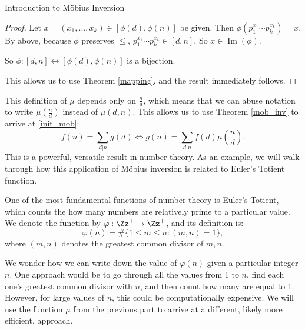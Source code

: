 \documentclass[12pt]{pom_thesis}
\DeclareMathOperator{\im}{Im}
\begin{document}
\begin{chapter}{Introduction to M\"obius Inversion}
\begin{proof}
Let $x = (x_1,...,x_k) \in [\phi(d), \phi(n)]$ be given. Then $\phi(p_1^{x_1}\cdots p_k^{x_k}) = x$. By above, because $\phi$ preserves $\leq$, $p_1^{x_1}\cdots p_k^{x_k} \in [d,n]$. So $x \in \im(\phi)$. 

So $\phi:[d,n] \leftrightarrow [\phi(d), \phi(n)]$ is a bijection.

This allows us to use Theorem \ref{mapping}, and the result immediately follows.
\end{proof}

This definition of $\mu$ depends only on $\frac nd$, which means that we can abuse notation to write $\mu(\frac nd)$ instead of $\mu(d,n)$. This allows us to use Theorem \ref{mob_inv} to arrive at \eqref{init_mob}:
\[
f(n) = \sum_{d | n} g(d) \iff g(n) = \sum_{d | n}  f(d)\mu\left(\frac nd\right).
\]
This is a powerful, versatile result in number theory. As an example, we will walk through how this application of M\"obius inversion is related to Euler's Totient function.
\begin{examp}
One of the most fundamental functions of number theory is Euler's Totient, which counts the how many numbers are relatively prime to a particular value. We denote the function by $\varphi : \Zz^+ \rightarrow \Zz^+$, and its definition is:
\[
\varphi(n) = \#\{1 \leq m \leq n : (m,n) = 1\},
\]
where $(m,n)$ denotes the greatest common divisor of $m,n$.

We wonder how we can write down the value of $\varphi(n)$ given a particular integer $n$. One approach would be to go through all the values from 1 to $n$, find each one's greatest common divisor with $n$, and then count how many are equal to 1. However, for large values of $n$, this could be computationally expensive. We will use the function $\mu$ from the previous part to arrive at a different, likely more efficient, approach.


\end{examp}
\end{chapter}
\end{document}
